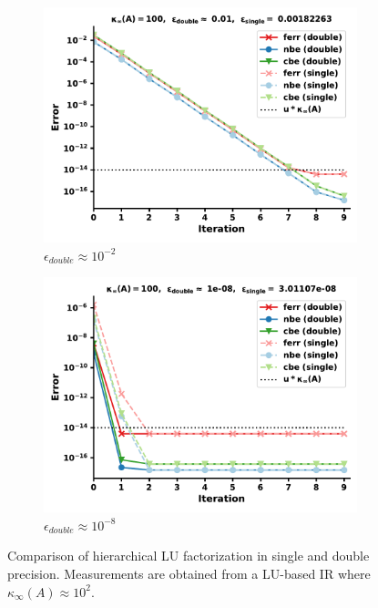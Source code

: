 \begin{figure}[h]
\centering
\begin{subfigure}{.5\textwidth}
  \centering
  \includegraphics[width=\linewidth]{chapters/5_experiments/figures/LU512_e0_0s.pdf}
  \caption{$\epsilon_{double} \approx 10^{-2}$}
  \label{fig:lrirs1_1}
\end{subfigure}%
\begin{subfigure}{.5\textwidth}
  \centering
  \includegraphics[width=\linewidth]{chapters/5_experiments/figures/LU512_e0_1s.pdf}
  \caption{$\epsilon_{double} \approx 10^{-8}$}
  \label{fig:lrirs1_2}
\end{subfigure}
\caption[Mixed Precision Low-Rank LU-IR 1]{Comparison of hierarchical LU factorization in single and double precision. Measurements are obtained from a LU-based IR where $\kappa_\infty(A) \approx 10^2$.}
\label{fig:lrirs1}
\end{figure}

